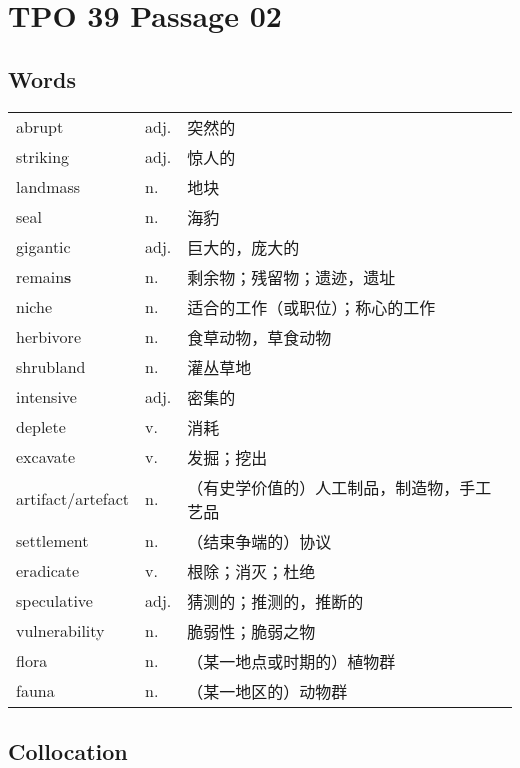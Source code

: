 \section{TPO 39 Passage 02}

\subsection{Words}

\begin{tabular}{lll}
    abrupt            & adj. & 突然的                   \\
    striking          & adj. & 惊人的                   \\
    landmass          & n.   & 地块                    \\
    seal              & n.   & 海豹                    \\
    gigantic          & adj. & 巨大的，庞大的               \\
    remain\textbf{s}  & n.   & 剩余物；残留物；遗迹，遗址         \\
    niche             & n.   & 适合的工作（或职位）；称心的工作      \\
    herbivore         & n.   & 食草动物，草食动物             \\
    shrubland         & n.   & 灌丛草地                  \\
    intensive         & adj. & 密集的                   \\
    deplete           & v.   & 消耗                    \\
    excavate          & v.   & 发掘；挖出                 \\
    artifact/artefact & n.   & （有史学价值的）人工制品，制造物，手工艺品 \\
    settlement        & n.   & （结束争端的）协议             \\
    eradicate         & v.   & 根除；消灭；杜绝              \\
    speculative       & adj. & 猜测的；推测的，推断的           \\
    vulnerability     & n.   & 脆弱性；脆弱之物              \\
    flora             & n.   & （某一地点或时期的）植物群         \\
    fauna             & n.   & （某一地区的）动物群            \\
\end{tabular}

\subsection{Collocation}

